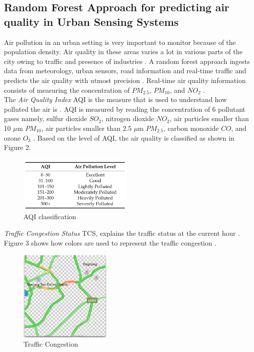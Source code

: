 \documentclass[sigconf]{acmart}
\begin{document}
\subsection{Random Forest Approach for predicting air quality in Urban Sensing Systems}
Air pollution in an urban setting is very important to monitor because of the population density. Air quality in these areas varies a lot in various parts of the city owing to traffic and presence of industries \cite{raq2016}. A random forest approach ingests data from meteorology, urban sensors, road information and real-time traffic and predicts the air quality with utmost precision \cite{raq2016}. Real-time air quality information consists of measuring the concentration of $PM_{2.5}$, $PM_{10}$, and $NO_{2}$ \cite{raq2016}. \\
The {\em Air Quality Index} AQI is the measure that is used to understand how polluted the air is \cite{raq2016}. AQI is measured by reading the concentration of 6 pollutant gases namely, sulfur dioxide $SO_{2}$, nitrogen dioxide $NO_{2}$, air particles smaller than 10 $\mu$m $PM_{10}$, air particles smaller than 2.5 $\mu$m $PM_{2.5}$, carbon monoxide $CO$, and ozone $O_3$ \cite{raq2016}. Based on the level of AQI, the air quality is classified as shown in Figure 2. 

\begin{figure}
\includegraphics[width=0.5\textwidth]{images/fig2.png}
\caption{AQI classification \cite{raq2016}}
\end{figure}

{\em Traffic Congestion Status} TCS, explains the traffic status at the current hour \cite{raq2016}. Figure 3 shows how colors are used to represent the traffic congestion \cite{raq2016}.

\begin{figure}
\includegraphics[width=0.4\textwidth]{images/fig3.png}
\caption{Traffic Congestion\cite{raq2016}}
\end{figure}
\end{document}
